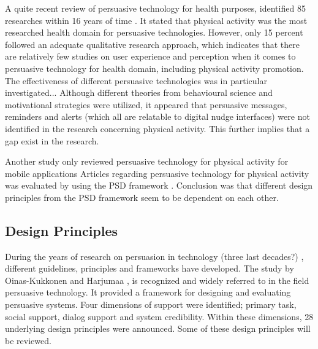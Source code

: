 A quite recent review of persuasive technology for health purposes, identified 85 researches within 16 years of time 
\cite{orji_persuasive_2018}.
It stated that physical activity was the most researched health domain for persuasive technologies. However, only 15 percent followed an adequate qualitative research approach, which indicates that there are relatively few studies on user experience and perception when it comes to persuasive technology for health domain, including physical activity promotion. The effectiveness of different persuasive technologies was in particular investigated... 
Although different theories from behavioural science and motivational strategies were utilized, it appeared that persuasive messages, reminders and alerts (which all are relatable to digital nudge interfaces) were not identified in the research concerning physical activity. This further implies that a gap exist in the research.

Another study only reviewed persuasive technology for physical activity for mobile applications 
\cite{matthews_persuasive_2016}
Articles regarding persuasive technology for physical activity was evaluated by using the PSD framework 
\cite{oinas-kukkonen_persuasive_2009}. Conclusion was that different design principles from the PSD framework seem to be dependent on each other. 

\subsection{Design Principles}
During the years of research on persuasion in technology (three last decades?) , different guidelines, principles and frameworks have developed. The study by Oinas-Kukkonen and Harjumaa\cite{oinas-kukkonen_persuasive_2009}
, is recognized and widely referred to in the field persuasive technology. It provided a framework for designing and evaluating persuasive systems. Four dimensions of support were identified; primary task, social support, dialog support and system credibility. Within these dimensions, 28 underlying design principles were announced. Some of these design principles will be reviewed. 

